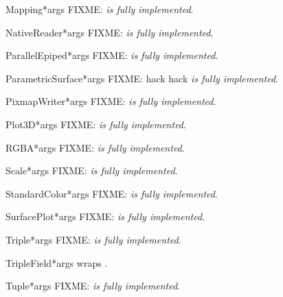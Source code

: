 \documentclass{manual}
\begin{document}
\begin{classdesc}{Mapping}{*args}
FIXME: \emph{is fully implemented}.
\end{classdesc}

\begin{classdesc}{NativeReader}{*args}
FIXME: \emph{is fully implemented}.
\end{classdesc}

\begin{classdesc}{ParallelEpiped}{*args}
FIXME: \emph{is fully implemented}.
\end{classdesc}

\begin{classdesc}{ParametricSurface}{*args}
FIXME: hack hack \emph{is fully implemented}.
\end{classdesc}

\begin{classdesc}{PixmapWriter}{*args}
FIXME: \emph{is fully implemented}.
\end{classdesc}

\begin{classdesc}{Plot3D}{*args}
FIXME: \emph{is fully implemented}.
\end{classdesc}

\begin{classdesc}{RGBA}{*args}
FIXME: \emph{is fully implemented}.
\end{classdesc}

\begin{classdesc}{Scale}{*args}
FIXME: \emph{is fully implemented}.
\end{classdesc}

\begin{classdesc}{StandardColor}{*args}
FIXME: \emph{is fully implemented}.
\end{classdesc}

\begin{classdesc}{SurfacePlot}{*args}
FIXME: \emph{is fully implemented}.
\end{classdesc}

\begin{classdesc}{Triple}{*args}
FIXME: \emph{is fully implemented}.
\end{classdesc}

\begin{classdesc}{TripleField}{*args}
wraps .
\end{classdesc}

\begin{classdesc}{Tuple}{*args}
FIXME: \emph{is fully implemented}.
\end{classdesc}
\end{document}
